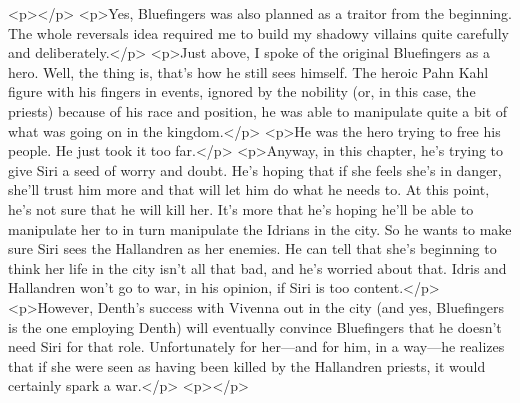 <p></p>
<p>Yes, Bluefingers was also planned as a traitor from the beginning. The whole reversals idea required me to build my shadowy villains quite carefully and deliberately.</p>
<p>Just above, I spoke of the original Bluefingers as a hero. Well, the thing is, that’s how he still sees himself. The heroic Pahn Kahl figure with his fingers in events, ignored by the nobility (or, in this case, the priests) because of his race and position, he was able to manipulate quite a bit of what was going on in the kingdom.</p>
<p>He was the hero trying to free his people. He just took it too far.</p>
<p>Anyway, in this chapter, he’s trying to give Siri a seed of worry and doubt. He’s hoping that if she feels she’s in danger, she’ll trust him more and that will let him do what he needs to. At this point, he’s not sure that he will kill her. It’s more that he’s hoping he’ll be able to manipulate her to in turn manipulate the Idrians in the city. So he wants to make sure Siri sees the Hallandren as her enemies. He can tell that she’s beginning to think her life in the city isn’t all that bad, and he’s worried about that. Idris and Hallandren won’t go to war, in his opinion, if Siri is too content.</p>
<p>However, Denth’s success with Vivenna out in the city (and yes, Bluefingers is the one employing Denth) will eventually convince Bluefingers that he doesn’t need Siri for that role. Unfortunately for her—and for him, in a way—he realizes that if she were seen as having been killed by the Hallandren priests, it would certainly spark a war.</p>
<p></p>



